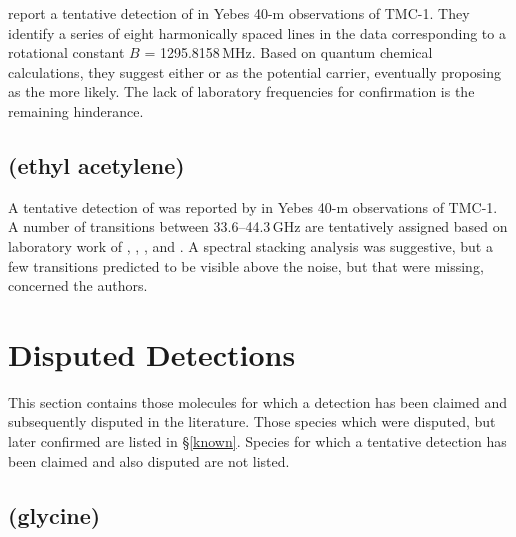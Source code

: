 \documentclass[twocolumn]{aastex631}
\newcommand{\update}[1]{{#1}}
\begin{document}
    \update{\citet{2020A&A...643L...6M} report a tentative detection of \ce{HC5NH+} in Yebes 40-m observations of TMC-1.  They identify a series of eight harmonically spaced lines in the data corresponding to a rotational constant $B$ = 1295.8158\,MHz.  Based on quantum chemical calculations, they suggest either \ce{HC5NH+} or \ce{NC4NH+} as the potential carrier, eventually proposing \ce{HC5NH+} as the more likely.  The lack of laboratory frequencies for confirmation is the remaining hinderance.}
    
    \subsection{\update{ (ethyl acetylene)}}
    \label{CH3CH2CCH}
    
    \update{A tentative detection of  was reported by \citet{Cernicharo:2021fk} in Yebes 40-m observations of TMC-1.   A number of transitions between {33.6--44.3}\,GHz are tentatively assigned based on laboratory work of \citet{1983JMoSp..98..210L}, \citet{1983ZNatA..38..447D}, \citet{1985ZNatA..40..263B}, and \citet{Steber:2012fx}.  A spectral stacking analysis was suggestive, but a few transitions predicted to be visible above the noise, but that were missing, concerned the authors.}
    
\section{Disputed Detections}
\label{disputed}

This section contains those molecules for which a detection has been claimed and subsequently disputed in the literature.  Those species which were disputed, but later confirmed are listed in \S\ref{known}.  Species for which a tentative detection has been claimed and also disputed are not listed.  
    
    \subsection{ (glycine)}
    \label{glycine}
    
\end{document}
